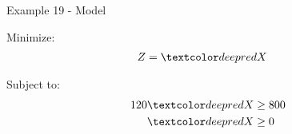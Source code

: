 \begin{frame}{Example 19 - Model}

Minimize:
\begin{align*}
    Z &= \colora{X}
\end{align*}

Subject to:
\begin{align*}
    120\colora{X} &\ge 800 \\
       \colora{X} &\ge 0
\end{align*}

\end{frame}
